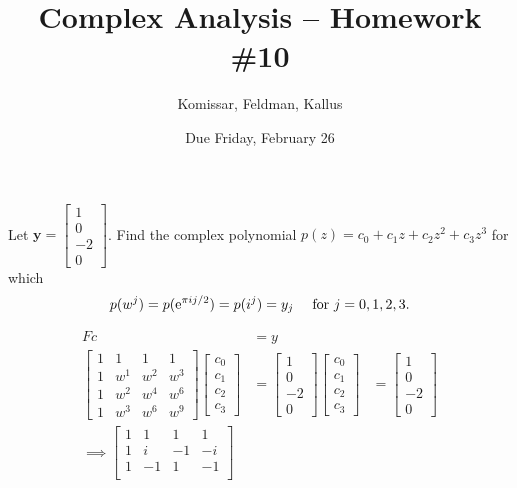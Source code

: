\documentclass[11pt]{article}       %
\title{Complex Analysis -- Homework \#10}
\author{Komissar, Feldman, Kallus}
\date{ Due Friday, February 26 }
\theoremstyle{definition}
\begin{document}
\color{white}
\pagecolor{black}
\maketitle

  Let $\mathbf y =\left[ \begin{smallmatrix} 1 \\ 0 \\ -2 \\ 0 \end{smallmatrix} \right]$.  Find the complex polynomial $p(z) = c_0 + c_1z + c_2z^2 +c_3z^3$  for which
\[
p(w^j)=p( {\rm e}^{\pi i j/2} )= p( i^j )=y_j \quad \text{ for } j = 0, 1, 2, 3.
\]

\begin{align*}
    Fc &= y \\
    \begin{bmatrix}
        1 & 1 & 1 & 1 \\
        1 & w^1 & w^2 & w^3 \\
        1 & w^2 & w^4 & w^6 \\
        1 & w^3 & w^6 & w^9
    \end{bmatrix}
    \begin{bmatrix}
        c_0 \\ c_1 \\ c_2 \\ c_3
    \end{bmatrix}
    &=
    \begin{bmatrix}
        1 \\ 0 \\ -2 \\ 0
    \end{bmatrix}
    \begin{bmatrix}
        c_0 \\ c_1 \\ c_2 \\ c_3
    \end{bmatrix}
    &=
    \begin{bmatrix}
        1 \\ 0 \\ -2 \\ 0
    \end{bmatrix} \\
    \implies \begin{bmatrix}
        1 & 1 & 1 & 1 \\
        1 & i & -1 & -i \\
        1 & -1 & 1 & -1 \\

\end{bmatrix}
\end{align*}
\end{document}
